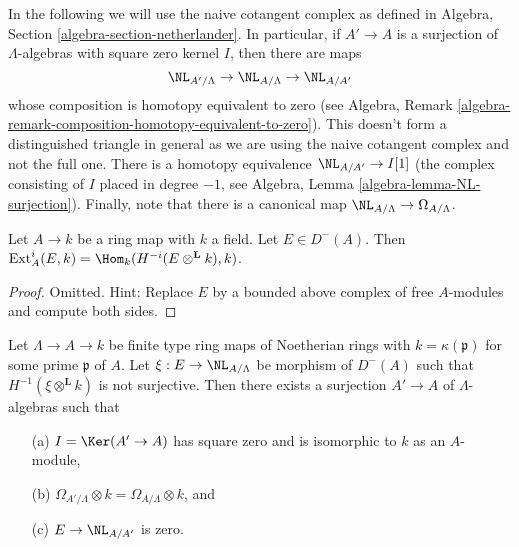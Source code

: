 \medskip\noindent
In the following we will use the naive cotangent complex as
defined in Algebra, Section \ref{algebra-section-netherlander}.
In particular, if $A' \to A$ is a surjection of $\Lambda$-algebras
with square zero kernel $I$, then there are maps
$$
\NL_{A'/\Lambda} \to \NL_{A/\Lambda} \to \NL_{A/A'}
$$
whose composition is homotopy equivalent to zero (see
Algebra, Remark \ref{algebra-remark-composition-homotopy-equivalent-to-zero}).
This doesn't form a distinguished triangle in general as we are using
the naive cotangent complex and not the full one.
There is a homotopy equivalence $\NL_{A/A'} \to I[1]$ (the complex
consisting of $I$ placed in degree $-1$, see
Algebra, Lemma \ref{algebra-lemma-NL-surjection}).
Finally, note that there is a canonical map
$\NL_{A/\Lambda} \to \Omega_{A/\Lambda}$.

\begin{lemma}
\label{lemma-compute-ext-into-field}
Let $A \to k$ be a ring map with $k$ a field. Let $E \in D^-(A)$.
Then $\text{Ext}^i_A(E, k) = \Hom_k(H^{-i}(E \otimes^\mathbf{L} k), k)$.
\end{lemma}

\begin{proof}
Omitted. Hint: Replace $E$ by a bounded above complex of free $A$-modules
and compute both sides.
\end{proof}

\begin{lemma}
\label{lemma-construct-essential-surjection}
Let $\Lambda \to A \to k$ be finite type ring maps of Noetherian rings with
$k = \kappa(\mathfrak p)$ for some prime $\mathfrak p$ of $A$. Let
$\xi : E \to \NL_{A/\Lambda}$ be morphism of $D^{-}(A)$ such that
$H^{-1}(\xi \otimes^{\mathbf{L}} k)$ is not surjective.
Then there exists a surjection $A' \to A$ of $\Lambda$-algebras
such that
\begin{enumerate}
\item[(a)] $I = \Ker(A' \to A)$ has square zero and is isomorphic to $k$
as an $A$-module,
\item[(b)] $\Omega_{A'/\Lambda} \otimes k = \Omega_{A/\Lambda} \otimes k$, and
\item[(c)] $E \to \NL_{A/A'}$ is zero.
\end{enumerate}
\end{lemma}

